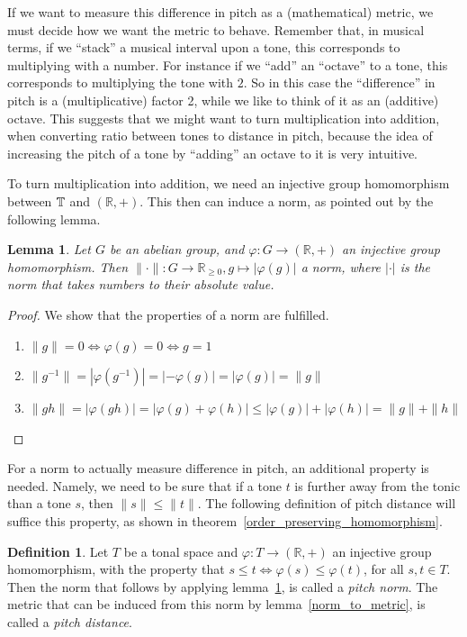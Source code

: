 \documentclass[a4paper]{book}
\newtheorem{lemma}[theorem]{Lemma}
\theoremstyle{definition}
\newtheorem{definition}[theorem]{Definition}
\begin{document}
If we want to measure this difference in pitch as a (mathematical) metric, we must decide how we want the metric to behave.
Remember that, in musical terms, if we ``stack'' a musical interval upon a tone, this corresponds to multiplying with a number.
For instance if we ``add'' an ``octave'' to a tone, this corresponds to multiplying the tone with $2$.
So in this case the ``difference'' in pitch is a (multiplicative) factor 2, while we like to think of it as an (additive) octave.
This suggests that we might want to turn multiplication into addition, when converting ratio between tones to distance in pitch, because the idea of increasing the pitch of a tone by ``adding'' an octave to it is very intuitive.

To turn multiplication into addition, we need an injective group homomorphism between $\mathbb{T}$ and $(\mathbb{R},+)$.
This then can induce a norm, as pointed out by the following lemma.

\begin{lemma}
    Let $G$ be an abelian group, and $\varphi : G \to (\mathbb{R},+)$ an injective group homomorphism.
    Then $\| \cdot \| : G \to \mathbb{R}_{\geq 0}, g \mapsto |\varphi(g)|$ a norm, where $| \cdot |$ is the norm that takes numbers to their absolute value.
    \label{homomorphism_to_metric}
\end{lemma}
\begin{proof}
    We show that the properties of a norm are fulfilled.
    \begin{enumerate}[i]
        \item $\|g\| = 0 \Leftrightarrow \varphi(g) = 0 \Leftrightarrow g = 1$
        \item $\|g^{-1}\| = |\varphi(g^{-1})| = |-\varphi(g)| = |\varphi(g)| = \|g\|$
        \item $\|gh\| = |\varphi(gh)| = |\varphi(g) + \varphi(h)| \leq |\varphi(g)| + |\varphi(h)| = \|g\| + \|h\|$
    \end{enumerate}
\end{proof}

For a norm to actually measure difference in pitch, an additional property is needed.
Namely, we need to be sure that if a tone $t$ is further away from the tonic than a tone $s$, then $\|s\| \leq \|t\|$.
The following definition of pitch distance will suffice this property, as shown in theorem~\ref{order_preserving_homomorphism}.

\begin{definition}
    Let $T$ be a tonal space and $\varphi : T \to (\mathbb{R},+)$ an injective group homomorphism,
    with the property that $s \leq t \Leftrightarrow \varphi(s) \leq \varphi(t)$, for all $s,t \in T$.
    Then the norm that follows by applying lemma~\ref{homomorphism_to_metric}, is called a \emph{pitch norm}.
    The metric that can be induced from this norm by lemma~\ref{norm_to_metric}, is called a \emph{pitch distance}.
\end{definition}
\end{document}
